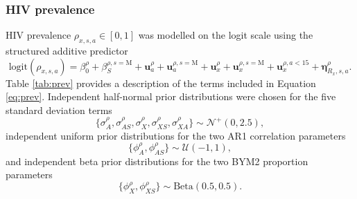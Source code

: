 \documentclass[a4paper, nobind]{templates/ociamthesis}
\begin{document}
\hypertarget{hiv-prev}{%
\subsubsection{HIV prevalence}\label{hiv-prev}}

HIV prevalence \(\rho_{x, s, a} \in [0, 1]\) was modelled on the logit scale using the structured additive predictor
\begin{equation}
\text{logit}(\rho_{x, s, a}) = \beta^\rho_0 + \beta_{S}^{\rho, s = \text{M}} + \mathbf{u}^\rho_a + \mathbf{u}_a^{\rho, s = \text{M}} + \mathbf{u}^\rho_x + \mathbf{u}_x^{\rho, s = \text{M}} + \mathbf{u}_x^{\rho, a < 15} + \boldsymbol{\mathbf{\eta}}^\rho_{R_x, s, a}. \label{eq:prev}
\end{equation}
Table \ref{tab:prev} provides a description of the terms included in Equation \eqref{eq:prev}.
Independent half-normal prior distributions were chosen for the five standard deviation terms
\begin{equation}
\{\sigma_A^\rho, \sigma_{AS}^\rho, \sigma_X^\rho, \sigma_{XS}^\rho, \sigma_{XA}^\rho\} \sim \mathcal{N}^{+}(0, 2.5),
\end{equation}
independent uniform prior distributions for the two AR1 correlation parameters
\begin{equation}
\{\phi_A^\rho, \phi_{AS}^\rho\} \sim \mathcal{U}(-1, 1),
\end{equation}
and independent beta prior distributions for the two BYM2 proportion parameters
\begin{equation}
\{\phi_X^\rho, \phi_{XS}^\rho\} \sim \text{Beta}(0.5, 0.5).
\end{equation}
\end{document}
